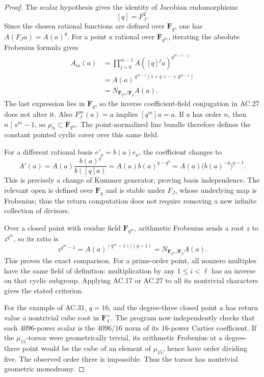 \begin{proof}
The scalar hypothesis gives the identity of Jacobian
endomorphisms
\[
                             [q]=F_J^2.
\]
Since the chosen rational functions are defined over
\(\mathbf F_q\), one has \(A(F_Ja)=A(a)^q\).
For a point \(a\) rational over \(\mathbf F_{q^m}\),
iterating the absolute Frobenius formula gives
\[
\begin{aligned}
 A_m(a)
  &=\prod_{j=0}^{m-1}
      A([q]^j a)^{q^{m-1-j}}\\
  &=A(a)^{\,q^{m-1}(1+q+\cdots+q^{m-1})}\\
  &=N_{\mathbf F_{q^m}/\mathbf F_q}A(a).
\end{aligned}
\]
The last expression lies in \(\mathbf F_q\), so the inverse
coefficient-field conjugation in AC.27 does not alter it.
Also \(F_J^m(a)=a\) implies \([q^m]a=a\).
If \(a\) has order \(n\), then \(n\mid s^m-1\), so
\(\mu_n\subset\mathbf F_{q^m}\).
The point-normalized line bundle therefore defines the
constant pointed cyclic cover over this same field.

For a different rational basis \(e'_a=b(a)e_a\), the coefficient
changes to
\[
 A'(a)=A(a)\frac{b(a)^q}{b([q]a)}
       =A(a)b(a)^{q-q^2}
       =A(a)\bigl(b(a)^{-q}\bigr)^{q-1}.
\]
This is precisely a change of Kummer generator, proving
basis independence. The relevant open is defined over
\(\mathbf F_q\) and is stable under \(F_J\), whose underlying
map is Frobenius; thus the return computation does not
require removing a new infinite collection of divisors.

Over a closed point with residue field \(\mathbf F_{q^m}\),
arithmetic Frobenius sends a root \(z\) to \(z^{q^m}\), so
its ratio is
\[
             z^{q^m-1}
              =A(a)^{(q^m-1)/(q-1)}
              =N_{\mathbf F_{q^m}/\mathbf F_q}A(a).
\]
This proves the exact comparison. For a prime-order
point, all nonzero multiples have the same field of
definition: multiplication by any \(1\le i<\ell\)
has an inverse on that cyclic subgroup.
Applying AC.17 or AC.27 to all its nontrivial characters
gives the stated criterion.

For the example of AC.31, \(q=16\), and the degree-three
closed point \(a\) has return value a nontrivial cube
root in \(\mathbf F_4^\times\).
The program now independently checks that each
\(4096\)-power scalar is the \(4096/16\) norm of its
\(16\)-power Cartier coefficient.
If the \(\mu_{15}\)-torsor were geometrically trivial,
its arithmetic Frobenius at a degree-three point would
be the cube of an element of \(\mu_{15}\), hence have
order dividing five. The observed order three is
impossible. Thus the torsor has nontrivial geometric
monodromy.


\end{proof}
